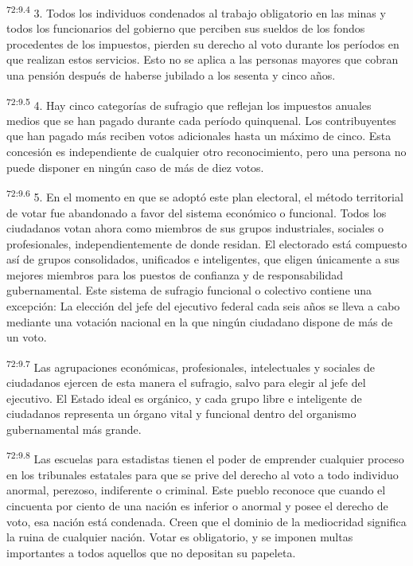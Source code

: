 \par
\textsuperscript{72:9.4} 3. Todos los individuos condenados al trabajo obligatorio en las minas y todos los funcionarios del gobierno que perciben sus sueldos de los fondos procedentes de los impuestos, pierden su derecho al voto durante los períodos en que realizan estos servicios. Esto no se aplica a las personas mayores que cobran una pensión después de haberse jubilado a los sesenta y cinco años.

\par
\textsuperscript{72:9.5} 4. Hay cinco categorías de sufragio que reflejan los impuestos anuales medios que se han pagado durante cada período quinquenal. Los contribuyentes que han pagado más reciben votos adicionales hasta un máximo de cinco. Esta concesión es independiente de cualquier otro reconocimiento, pero una persona no puede disponer en ningún caso de más de diez votos.

\par
\textsuperscript{72:9.6} 5. En el momento en que se adoptó este plan electoral, el método territorial de votar fue abandonado a favor del sistema económico o funcional. Todos los ciudadanos votan ahora como miembros de sus grupos industriales, sociales o profesionales, independientemente de donde residan. El electorado está compuesto así de grupos consolidados, unificados e inteligentes, que eligen únicamente a sus mejores miembros para los puestos de confianza y de responsabilidad gubernamental. Este sistema de sufragio funcional o colectivo contiene una excepción: La elección del jefe del ejecutivo federal cada seis años se lleva a cabo mediante una votación nacional en la que ningún ciudadano dispone de más de un voto.

\par
\textsuperscript{72:9.7} Las agrupaciones económicas, profesionales, intelectuales y sociales de ciudadanos ejercen de esta manera el sufragio, salvo para elegir al jefe del ejecutivo. El Estado ideal es orgánico, y cada grupo libre e inteligente de ciudadanos representa un órgano vital y funcional dentro del organismo gubernamental más grande.

\par
\textsuperscript{72:9.8} Las escuelas para estadistas tienen el poder de emprender cualquier proceso en los tribunales estatales para que se prive del derecho al voto a todo individuo anormal, perezoso, indiferente o criminal. Este pueblo reconoce que cuando el cincuenta por ciento de una nación es inferior o anormal y posee el derecho de voto, esa nación está condenada. Creen que el dominio de la mediocridad significa la ruina de cualquier nación. Votar es obligatorio, y se imponen multas importantes a todos aquellos que no depositan su papeleta.

